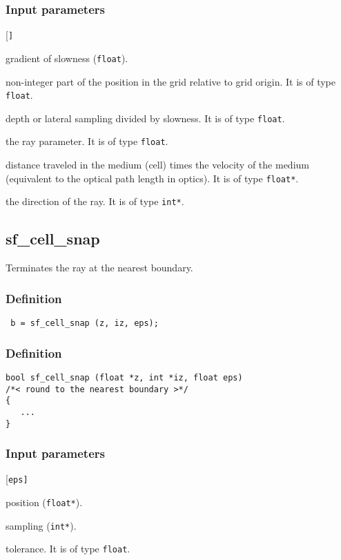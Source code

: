 \subsubsection*{Input parameters}
\begin{desclist}{\tt }{\quad}[\tt ]
   \setlength\itemsep{0pt}
   \item[a]  gradient of slowness (\texttt{float}).  
   \item[x]  non-integer part of the position in the grid relative to grid origin. It is of type \texttt{float}.
   \item[dy] depth or lateral sampling divided by slowness. It is of type \texttt{float}.
   \item[p]  the ray parameter. It is of type \texttt{float}.
   \item[sx] distance traveled in the medium (cell) times the velocity of the medium (equivalent to the optical path length in optics). It is of type \texttt{float*}.
   \item[jx]  the direction of the ray. It is of type \texttt{int*}.
\end{desclist}




\subsection{{sf\_cell\_snap}}
Terminates the ray at the nearest boundary.

\subsubsection*{Definition}
\begin{verbatim} b = sf_cell_snap (z, iz, eps);\end{verbatim}

\subsubsection*{Definition}
\begin{verbatim}
bool sf_cell_snap (float *z, int *iz, float eps)
/*< round to the nearest boundary >*/
{
   ...
}
\end{verbatim}

\subsubsection*{Input parameters}
\begin{desclist}{\tt }{\quad}[\tt eps]
   \setlength\itemsep{0pt}
   \item[z]   position (\texttt{float*}).  
   \item[iz]  sampling (\texttt{int*}).
   \item[eps] tolerance. It is of type \texttt{float}.
\end{desclist}

